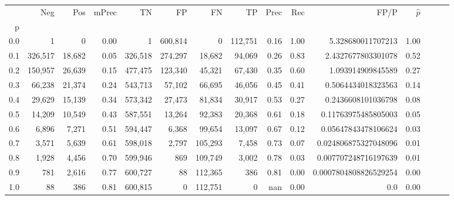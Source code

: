 \begin{tabular}{rrrrrrrrrrrrrrr}
\toprule
{} &      Neg &     Pos & mPrec &       TN &       FP &       FN &       TP &  Prec &   Rec &                   FP/P & $\hat{p}$ \\
p   &          &         &       &          &          &          &          &       &       &                        &           \\
\midrule
0.0 &        1 &       0 &  0.00 &        1 &  600,814 &        0 &  112,751 &  0.16 &  1.00 &      5.328680011707213 &      1.00 \\
0.1 &  326,517 &  18,682 &  0.05 &  326,518 &  274,297 &   18,682 &   94,069 &  0.26 &  0.83 &     2.4327677803301078 &      0.52 \\
0.2 &  150,957 &  26,639 &  0.15 &  477,475 &  123,340 &   45,321 &   67,430 &  0.35 &  0.60 &      1.093914909845589 &      0.27 \\
0.3 &   66,238 &  21,374 &  0.24 &  543,713 &   57,102 &   66,695 &   46,056 &  0.45 &  0.41 &     0.5064434018323563 &      0.14 \\
0.4 &   29,629 &  15,139 &  0.34 &  573,342 &   27,473 &   81,834 &   30,917 &  0.53 &  0.27 &     0.2436608101036798 &      0.08 \\
0.5 &   14,209 &  10,549 &  0.43 &  587,551 &   13,264 &   92,383 &   20,368 &  0.61 &  0.18 &    0.11763975485805003 &      0.05 \\
0.6 &    6,896 &   7,271 &  0.51 &  594,447 &    6,368 &   99,654 &   13,097 &  0.67 &  0.12 &    0.05647843478106624 &      0.03 \\
0.7 &    3,571 &   5,639 &  0.61 &  598,018 &    2,797 &  105,293 &    7,458 &  0.73 &  0.07 &   0.024806875327048096 &      0.01 \\
0.8 &    1,928 &   4,456 &  0.70 &  599,946 &      869 &  109,749 &    3,002 &  0.78 &  0.03 &   0.007707248716197639 &      0.01 \\
0.9 &      781 &   2,616 &  0.77 &  600,727 &       88 &  112,365 &      386 &  0.81 &  0.00 &  0.0007804808826529254 &      0.00 \\
1.0 &       88 &     386 &  0.81 &  600,815 &        0 &  112,751 &        0 &   nan &  0.00 &                    0.0 &      0.00 \\
\bottomrule
\end{tabular}
